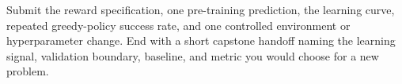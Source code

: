 \begin{labdeliverable}
Submit the reward specification, one pre-training prediction, the learning curve, repeated greedy-policy success rate, and one controlled environment or hyperparameter change. End with a short capstone handoff naming the learning signal, validation boundary, baseline, and metric you would choose for a new problem.
\end{labdeliverable}
